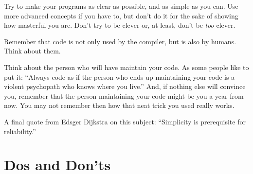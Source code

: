 Try to make your programs as clear as possible, and 
as simple as you can. Use more advanced concepts if 
you have to, but don't do it for the sake of showing how 
masterful you are. Don't try to be clever or, at least, 
don't be \emph{too} clever.

Remember that code is not only used by the compiler, but 
is also by humans. Think about them.

Think about the person who will have maintain your code. 
As some people like to put it: ``Always code as if the person 
who ends up maintaining your code is a violent psychopath 
who knows where you live.'' And, if nothing else will convince 
you, remember that the person maintaining your code might be 
you a year from now. You may not remember then 
how that neat trick you used really works.

A final quote from Edsger Dijkstra on this subject: 
``Simplicity is prerequisite for reliability.''

\section{Dos and Don'ts}

